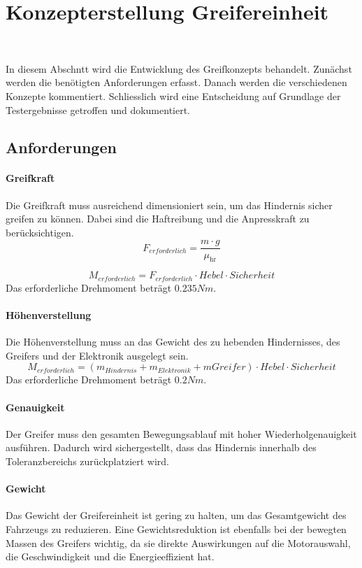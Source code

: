 \documentclass[main.tex]{subfiles} %
\begin{document}
\section{Konzepterstellung Greifereinheit}~\label{appendix:Greifereinheit}

In diesem Abschntt wird die Entwicklung des Greifkonzepts behandelt.
Zunächst werden die benötigten Anforderungen erfasst. 
Danach werden die verschiedenen Konzepte kommentiert.
Schliesslich wird eine Entscheidung auf Grundlage der Testergebnisse getroffen und dokumentiert.

\subsection*{Anforderungen}

\paragraph{Greifkraft}
Die Greifkraft muss ausreichend dimensioniert sein, um das Hindernis sicher greifen zu können.
Dabei sind die Haftreibung und die Anpresskraft zu berücksichtigen.
\[
    F_{erforderlich} = \frac{m \cdot g}{\mu_{\text{hr}}}
\]

\[
    M_{erforderlich} = F_{erforderlich} \cdot Hebel \cdot Sicherheit
\]
Das erforderliche Drehmoment beträgt $0.235 Nm$.

\paragraph{Höhenverstellung}
Die Höhenverstellung muss an das Gewicht des zu hebenden Hindernisses, des Greifers und der Elektronik ausgelegt sein.
\[
    M_{erforderlich} = (m_{Hindernis} + m_{Elektronik} + m{Greifer}) \cdot Hebel \cdot Sicherheit
\]
Das erforderliche Drehmoment beträgt $0.2 Nm$.

\paragraph{Genauigkeit}
Der Greifer muss den gesamten Bewegungsablauf mit hoher Wiederholgenauigkeit ausführen.
Dadurch wird sichergestellt, dass das Hindernis innerhalb des Toleranzbereichs
zurückplatziert wird.

\paragraph{Gewicht}
Das Gewicht der Greifereinheit ist gering zu halten, um das Gesamtgewicht des Fahrzeugs zu
reduzieren. Eine Gewichtsreduktion ist ebenfalls bei der bewegten Massen des Greifers wichtig, da sie
direkte Auswirkungen auf die Motorauswahl, die Geschwindigkeit und die Energieeffizient hat.
\end{document}
